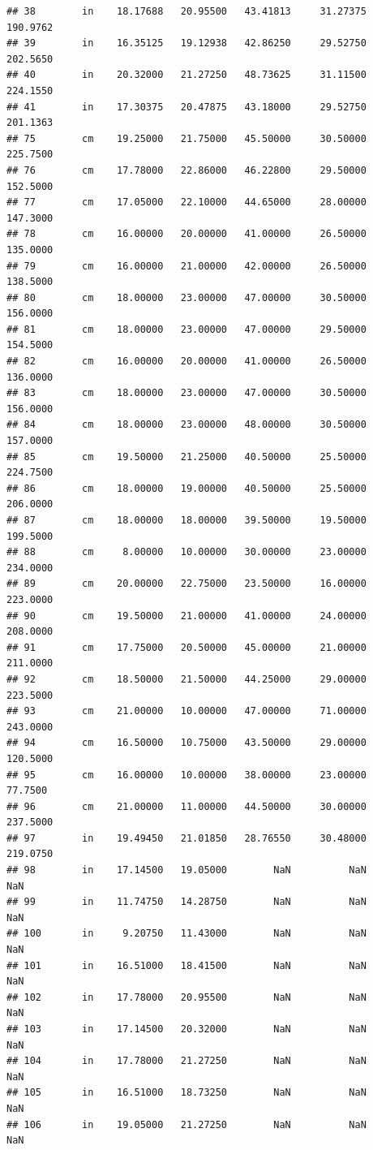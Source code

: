 \documentclass[]{article}
\begin{document}
\begin{verbatim}
## 38        in    18.17688   20.95500   43.41813     31.27375  190.9762
## 39        in    16.35125   19.12938   42.86250     29.52750  202.5650
## 40        in    20.32000   21.27250   48.73625     31.11500  224.1550
## 41        in    17.30375   20.47875   43.18000     29.52750  201.1363
## 75        cm    19.25000   21.75000   45.50000     30.50000  225.7500
## 76        cm    17.78000   22.86000   46.22800     29.50000  152.5000
## 77        cm    17.05000   22.10000   44.65000     28.00000  147.3000
## 78        cm    16.00000   20.00000   41.00000     26.50000  135.0000
## 79        cm    16.00000   21.00000   42.00000     26.50000  138.5000
## 80        cm    18.00000   23.00000   47.00000     30.50000  156.0000
## 81        cm    18.00000   23.00000   47.00000     29.50000  154.5000
## 82        cm    16.00000   20.00000   41.00000     26.50000  136.0000
## 83        cm    18.00000   23.00000   47.00000     30.50000  156.0000
## 84        cm    18.00000   23.00000   48.00000     30.50000  157.0000
## 85        cm    19.50000   21.25000   40.50000     25.50000  224.7500
## 86        cm    18.00000   19.00000   40.50000     25.50000  206.0000
## 87        cm    18.00000   18.00000   39.50000     19.50000  199.5000
## 88        cm     8.00000   10.00000   30.00000     23.00000  234.0000
## 89        cm    20.00000   22.75000   23.50000     16.00000  223.0000
## 90        cm    19.50000   21.00000   41.00000     24.00000  208.0000
## 91        cm    17.75000   20.50000   45.00000     21.00000  211.0000
## 92        cm    18.50000   21.50000   44.25000     29.00000  223.5000
## 93        cm    21.00000   10.00000   47.00000     71.00000  243.0000
## 94        cm    16.50000   10.75000   43.50000     29.00000  120.5000
## 95        cm    16.00000   10.00000   38.00000     23.00000   77.7500
## 96        cm    21.00000   11.00000   44.50000     30.00000  237.5000
## 97        in    19.49450   21.01850   28.76550     30.48000  219.0750
## 98        in    17.14500   19.05000        NaN          NaN       NaN
## 99        in    11.74750   14.28750        NaN          NaN       NaN
## 100       in     9.20750   11.43000        NaN          NaN       NaN
## 101       in    16.51000   18.41500        NaN          NaN       NaN
## 102       in    17.78000   20.95500        NaN          NaN       NaN
## 103       in    17.14500   20.32000        NaN          NaN       NaN
## 104       in    17.78000   21.27250        NaN          NaN       NaN
## 105       in    16.51000   18.73250        NaN          NaN       NaN
## 106       in    19.05000   21.27250        NaN          NaN       NaN

\end{verbatim}
\end{document}
